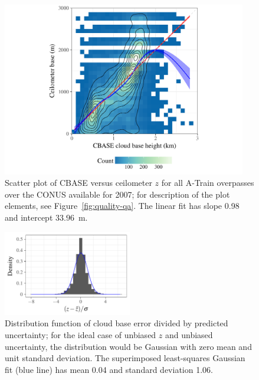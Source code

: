\documentclass[essd,manuscript]{copernicus}\usepackage[]{graphicx}\usepackage[]{color}
\newenvironment{knitrout}{}{} %
\newcommand\CBH{\ensuremath{z}}
\begin{document}
\begin{figure}
  \centering
\begin{knitrout}
\color{fgcolor}

{\centering \includegraphics[width=0.95\textwidth]{figure/method-combo-plot-1} 

}



\end{knitrout}
  \caption{Scatter plot of CBASE versus ceilometer \CBH{} for all A-Train
    overpasses over the CONUS available for 2007; for description of the
  plot elements, see Figure~\ref{fig:quality-qa}.  The linear fit has slope
  0.98 and intercept $33.96$~\unit{m}.}
  \label{fig:eval}
\end{figure}

\begin{figure}
  \centering
\begin{knitrout}
\color{fgcolor}

{\centering \includegraphics[width=0.5\textwidth]{figure/method-combo-eval-pull-1} 

}



\end{knitrout}
  \caption{Distribution function of cloud base error divided by predicted
    uncertainty; for the ideal case of unbiased \CBH{} and unbiased
    uncertainty, the distribution would be Gaussian with zero mean and unit
    standard deviation.  The superimposed least-squares Gaussian fit (blue line)
    has mean 0.04 and
    standard deviation 1.06.}
  \label{fig:pull}
\end{figure}
\end{document}
